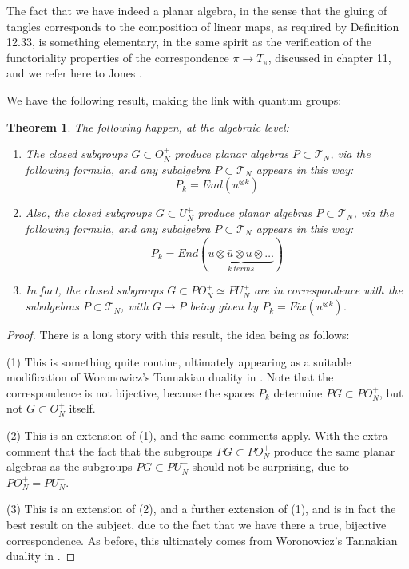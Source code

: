 \documentclass[12pt]{amsbook}
\newtheorem{theorem}{Theorem}[chapter]
\begin{document}
\bigskip

The fact that we have indeed a planar algebra, in the sense that the gluing of tangles corresponds to the composition of linear maps, as required by Definition 12.33, is something elementary, in the same spirit as the verification of the functoriality properties of the correspondence $\pi\to T_\pi$, discussed in chapter 11, and we refer here to Jones \cite{jo3}. 

\bigskip

We have the following result, making the link with quantum groups:

\begin{theorem}
The following happen, at the algebraic level:
\begin{enumerate}
\item The closed subgroups $G\subset O_N^+$ produce planar algebras $P\subset\mathcal T_N$, via the following formula, and any subalgebra $P\subset\mathcal T_N$ appears in this way:
$$P_k=End(u^{\otimes k})$$

\item Also, the closed subgroups $G\subset U_N^+$ produce planar algebras $P\subset\mathcal T_N$, via the following formula, and any subalgebra $P\subset\mathcal T_N$ appears in this way:
$$P_k=End(\underbrace{u\otimes\bar{u}\otimes u\otimes\ldots}_{k\ terms})$$

\item In fact, the closed subgroups $G\subset PO_N^+\simeq PU_N^+$ are in correspondence with the subalgebras $P\subset\mathcal T_N$, with $G\to P$ being given by $P_k=Fix(u^{\otimes k})$.
\end{enumerate}
\end{theorem}

\begin{proof}
There is a long story with this result, the idea being as follows:

\medskip

(1) This is something quite routine, ultimately appearing as a suitable modification of Woronowicz's Tannakian duality in \cite{wo2}. Note that the correspondence is not bijective, because the spaces $P_k$ determine $PG\subset PO_N^+$, but not $G\subset O_N^+$ itself.

\medskip

(2) This is an extension of (1), and the same comments apply. With the extra comment that the fact that the subgroups $PG\subset PO_N^+$ produce the same planar algebras as the subgroups $PG\subset PU_N^+$ should not be surprising, due to $PO_N^+=PU_N^+$.

\medskip

(3) This is an extension of (2), and a further extension of (1), and is in fact the best result on the subject, due to the fact that we have there a true, bijective correspondence. As before, this ultimately comes from Woronowicz's Tannakian duality in \cite{wo2}.
\end{proof}
\end{document}
